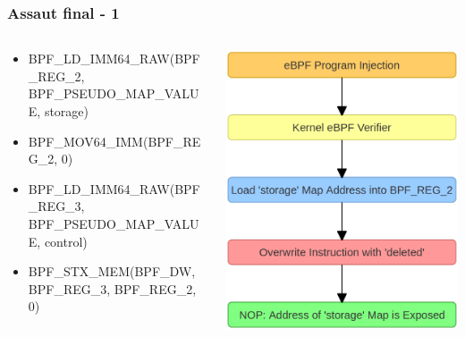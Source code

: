 \documentclass{beamer}
\begin{document}
\begin{frame}
    \frametitle{Assaut final - 1}

    \begin{columns}
        \begin{column}{0.5\textwidth}
        \scriptsize{
            \begin{itemize}
                \item[] BPF\_LD\_IMM64\_RAW(BPF\_REG\_2, BPF\_PSEUDO\_MAP\_VALUE, storage)
                \item[] BPF\_MOV64\_IMM(BPF\_REG\_2, 0)
                \item[] BPF\_LD\_IMM64\_RAW(BPF\_REG\_3, BPF\_PSEUDO\_MAP\_VALUE, control)
                \item[] BPF\_STX\_MEM(BPF\_DW, BPF\_REG\_3, BPF\_REG\_2, 0)
            \end{itemize}
            }
        \end{column}
        \begin{column}{0.5\textwidth}
            \begin{center}
                \includegraphics[scale=0.2]{exploit/etape1.png}
            \end{center}
        \end{column}
    \end{columns}
\end{frame}
\end{document}
